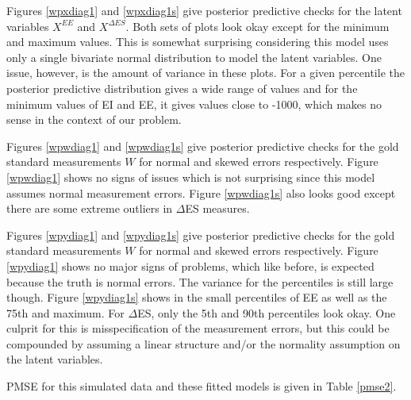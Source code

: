 \documentclass[11pt]{article}\usepackage[]{graphicx}\usepackage[]{color}
\begin{document}
Figures \ref{wpxdiag1} and \ref{wpxdiag1s} give posterior predictive checks for the latent variables $X^{EE}$ and $X^{\Delta ES}$.  Both sets of plots look okay except for the minimum and maximum values. This is somewhat surprising considering this model uses only a single bivariate normal distribution to model the latent variables. One issue, however, is the amount of variance in these plots. For a given percentile the posterior predictive distribution gives a wide range of values and for the minimum values of EI and EE, it gives values close to -1000, which makes no sense in the context of our problem.

Figures \ref{wpwdiag1} and \ref{wpwdiag1s} give posterior predictive checks for the gold standard measurements $W$ for normal and skewed errors respectively. Figure \ref{wpwdiag1} shows no signs of issues which is not surprising since this model assumes normal measurement errors. Figure \ref{wpwdiag1s} also looks good except there are some extreme outliers in $\Delta$ES measures.

Figures \ref{wpydiag1} and \ref{wpydiag1s} give posterior predictive checks for the gold standard measurements $W$ for normal and skewed errors respectively. Figure \ref{wpydiag1} shows no major signs of problems, which like before, is expected because the truth is normal errors. The variance for the percentiles is still large though. Figure \ref{wpydiag1s} shows in the small percentiles of EE as well as the 75th and maximum. For $\Delta$ES, only the 5th  and 90th percentiles look okay. One culprit for this is misspecification of the measurement errors, but this could be compounded by assuming a linear structure and/or the normality assumption on the latent variables.



PMSE for this simulated data and these fitted models is given in Table \ref{pmse2}.
\end{document}
